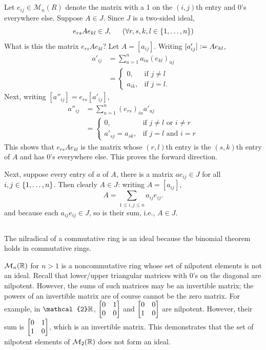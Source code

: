 \documentclass[12pt]{article}
\begin{document}
\subsection{} 
Let $e_{ij} \in \mathcal{M}_{n}(R)$ denote the matrix with a 1 on the $(i, j)$th entry and 0's everywhere else. 
Suppose $A \in J$. 
Since $J$ is a two-sided ideal, 
$$e_{rs}Ae_{kl} \in J, \hspace{1.5em} (\forall r, s, k, l \in \{1, \ldots, n\})$$
What is this the matrix $e_{rs} A e_{kl}$? 
Let $A = [a_{ij}]$. 
Writing $[a'_{ij}] \vcentcolon= Ae_{kl}$, 
\begin{align*}
  a'_{ij} & = \sum_{u = 1}^{n} a_{iu} (e_{kl})_{uj} \\ 
          & = \begin{cases} 
            0, & \text{if } j \neq l \\ 
            a_{ik}, & \text{if } j = l.
          \end{cases}
\end{align*}
Next, writing $[a''_{ij}] = e_{rs}[a'_{ij}]$, 
\begin{align*}
  a''_{ij} & = \sum_{u = 1}^{n} (e_{rs})_{iu} a'_{uj} \\ 
           & = \begin{cases} 
            0, & \text{if } j \neq l \text{ or } i \neq r \\ 
            a'_{sj} = a_{sk}, & \text{if } j = l \text{ and } i = r
           \end{cases}
\end{align*}
This shows that $e_{rs} A e_{kl}$ is the matrix whose $(r, l)$th entry is the $(s, k)$th entry of $A$ and has 0's everywhere else.
This proves the forward direction. 

Next, suppose every entry of $a$ of $A$, there is a matrix $a e_{ij} \in J$ for all $i, j \in \{1, \ldots, n\}$. 
Then clearly $A \in J$: 
writing $A = [a_{ij}]$, 
$$A = \sum_{1 \leq i, j \leq n} a_{ij} e_{ij}.$$
and because each $a_{ij} e_{ij} \in J$, so is their sum, 
i.e., $A \in J$. 

\setcounter{subsection}{11}
\subsection{} 
The nilradical of a commutative ring is an ideal because the binomial theorem holds in commutative rings. 

$\mathcal{M}_{n}(\mathbb{R})$ for $n > 1$ is a noncommutative ring whose set of nilpotent elements is not an ideal.
Recall that lower/upper triangular matrices with 0's on the diagonal are nilpotent. 
However, the sums of such matrices may be an invertible matrix; 
the powers of an invertible matrix are of course cannot be the zero matrix. 
For example, in $\mathcal{2}{\R}$, $\begin{bmatrix}0 & 1 \\0 & 0\end{bmatrix}$ and $\begin{bmatrix}0 & 0 \\1 & 0\end{bmatrix}$ are nilpotent. 
However, their sum is $\begin{bmatrix}0 & 1 \\ 1 & 0\end{bmatrix}$, which is an invertible matrix. 
This demonstrates that the set of nilpotent elements of $\mathcal{M}_{2}(\mathbb{R})$ does not form an ideal. 
\end{document}
